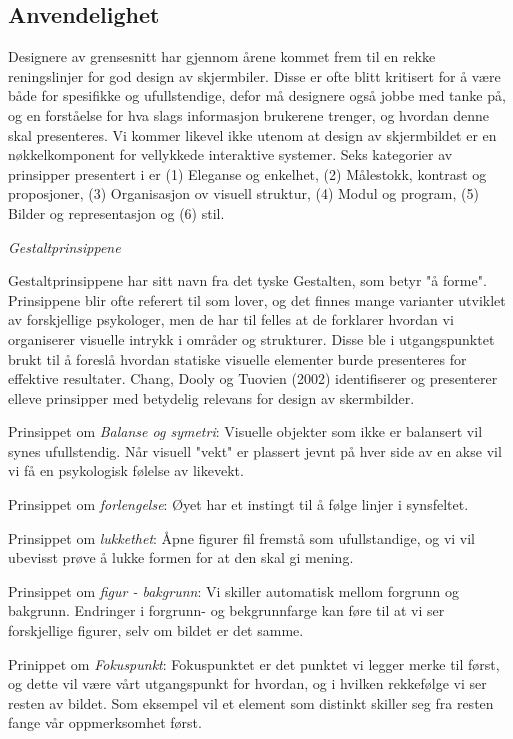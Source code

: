 \subsection{Anvendelighet}
\label{chp: anvendelighet}

Designere av grensesnitt har gjennom årene kommet frem til en rekke reningslinjer for god design av skjermbiler. Disse er ofte blitt kritisert for å være både for spesifikke og ufullstendige\cite{mmi}, defor må designere også jobbe med tanke på, og en forståelse for hva slags informasjon brukerene trenger, og hvordan denne skal presenteres\cite{Ebright10}. Vi kommer likevel ikke utenom at design av skjermbildet er en nøkkelkomponent for vellykkede interaktive systemer\cite{mmi}. Seks kategorier av prinsipper presentert i \cite{mmi} er (1) Eleganse og enkelhet,  (2) Målestokk, kontrast og proposjoner, (3) Organisasjon ov visuell struktur, (4) Modul og program, (5) Bilder og representasjon og (6) stil.

\noindent
\emph{Gestaltprinsippene}

\noindent
Gestaltprinsippene har sitt navn fra det tyske Gestalten, som betyr "å forme". Prinsippene blir ofte referert til som lover, og det finnes mange varianter utviklet av forskjellige psykologer, men de har til felles at de forklarer hvordan vi organiserer visuelle intrykk i områder og strukturer. Disse ble i utgangspunktet brukt til å foreslå hvordan statiske visuelle elementer burde presenteres for effektive resultater\cite{Chang02}. Chang, Dooly og Tuovien (2002) identifiserer og presenterer elleve prinsipper med betydelig relevans for design av skermbilder. 

\noindent
Prinsippet om \emph{Balanse og symetri}: Visuelle objekter som ikke er balansert vil synes ufullstendig. Når visuell "vekt" er plassert jevnt på hver side av en akse vil vi få en psykologisk følelse av likevekt.

\noindent
Prinsippet om \emph{forlengelse}: Øyet har et instingt til å følge linjer i synsfeltet.

\noindent
Prinsippet om \emph{lukkethet}: Åpne figurer fil fremstå som ufullstandige, og vi vil ubevisst prøve å lukke formen for at den skal gi mening.

\noindent
Prinsippet om \emph{figur - bakgrunn}: Vi skiller automatisk mellom forgrunn og bakgrunn. Endringer i forgrunn- og bekgrunnfarge kan føre til at vi ser forskjellige figurer, selv om bildet er det samme.

\noindent
Prinippet om \emph{Fokuspunkt}: Fokuspunktet er det punktet vi legger merke til først, og dette vil være vårt utgangspunkt for hvordan, og i hvilken rekkefølge vi ser resten av bildet. Som eksempel vil et element som distinkt skiller seg fra resten fange vår oppmerksomhet først.

